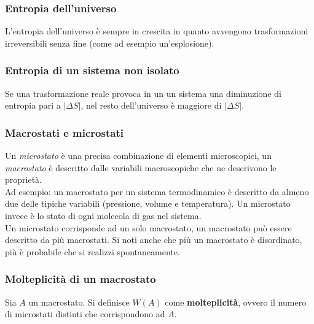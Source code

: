 \subsubsection{Entropia dell'universo}
L'entropia dell'universo è sempre in crescita in quanto avvengono trasformazioni irreversibili senza
fine (come ad esempio un'esplosione).

\subsubsection{Entropia di un sistema non isolato}
Se una trasformazione reale provoca in un un sistema una diminuzione di entropia pari a 
$\vert \Delta S \vert$, nel resto dell'universo è maggiore di $\vert \Delta S \vert$.

\subsubsection{Macrostati e microstati}
Un \emph{microstato} è una precisa combinazione di elementi microscopici, un \emph{macrostato} è 
descritto dalle variabili macroscopiche che ne descrivono le proprietà.\\
Ad esempio: un macrostato per un sistema termodinamico è descritto da almeno due delle tipiche 
variabili (pressione, volume e temperatura). Un microstato invece è lo stato di ogni molecola di gas 
nel sistema.\\
Un microstato corrisponde ad un solo macrostato, un macrostato può essere descritto da più macrostati.
Si noti anche che più un macrostato è disordinato, più è probabile che si realizzi spontaneamente.

\subsubsection{Molteplicità di un macrostato}
Sia $A$ un macrostato. Si definisce $W(A)$ come \textbf{molteplicità}, ovvero il numero di microstati 
distinti che corrispondono ad $A$.

